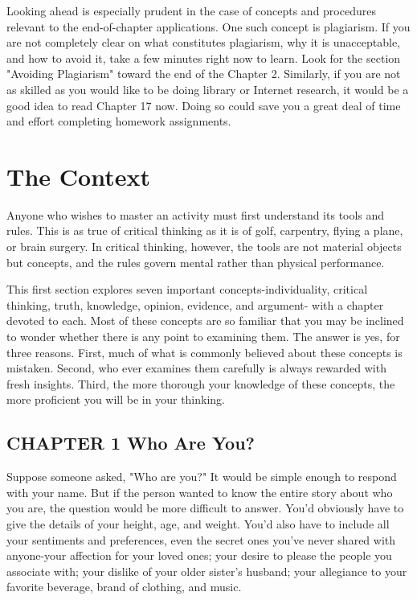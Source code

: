 \documentclass{book}
\begin{document}
Looking ahead is especially prudent in the case of concepts and procedures relevant to the end-of-chapter applications. One such concept is plagiarism. If you are not completely clear on what constitutes plagiarism, why it is unacceptable, and how to avoid it, take a few minutes right now to learn. Look for the section "Avoiding Plagiarism" toward the end of the Chapter 2. Similarly, if you are not as skilled as you would like to be doing library or Internet research, it would be a good idea to read Chapter 17 now. Doing so could save you a great deal of time and effort completing homework assignments.

\part{The Context}

Anyone who wishes to master an activity must first understand its tools and rules. This is as true of critical thinking as it is of golf, carpentry, flying a plane, or brain surgery. In critical thinking, however, the tools are not material objects but concepts, and the rules govern mental rather than physical performance.

This first section explores seven important concepts-individuality, critical thinking, truth, knowledge, opinion, evidence, and argument- with a chapter devoted to each. Most of these concepts are so familiar that you may be inclined to wonder whether there is any point to examining them. The answer is yes, for three reasons. First, much of what is commonly believed about these concepts is mistaken. Second, who ever examines them carefully is always rewarded with fresh insights. Third, the more thorough your knowledge of these concepts, the more proficient you will be in your thinking.

\chapter{CHAPTER 1 Who Are You?}

Suppose someone asked, "Who are you?" It would be simple enough to respond with your name. But if the person wanted to know the entire story about who you are, the question would be more difficult to answer. You’d obviously have to give the details of your height, age, and weight. You’d also have to include all your sentiments and preferences, even the secret ones you’ve never shared with anyone-your affection for your loved ones; your desire to please the people you associate with; your dislike of your older sister’s husband; your allegiance to your favorite beverage, brand of clothing, and music.
\end{document}
